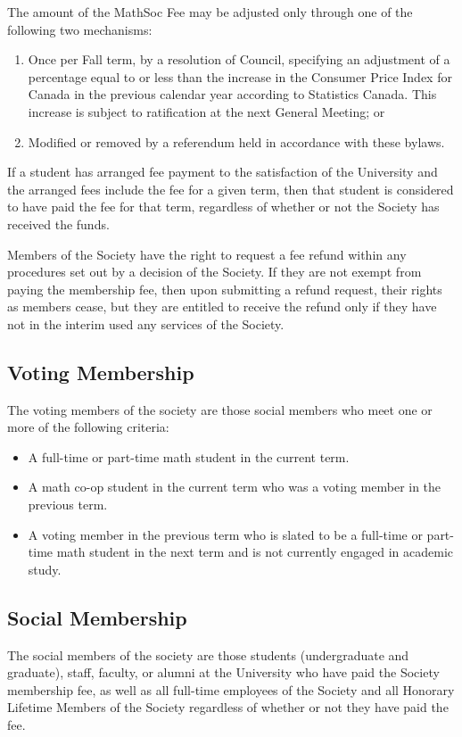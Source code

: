 The amount of the MathSoc Fee may be adjusted only through one of the following two mechanisms:
\begin{enumerate}
\item Once per Fall term, by a resolution of Council, specifying an adjustment of a percentage equal
to or less than the increase in the Consumer Price Index for Canada in the previous calendar year
according to Statistics Canada. This increase is subject to ratification at the next General Meeting; or
\item Modified or removed by a referendum held in accordance with these bylaws.
\end{enumerate}

If a student has arranged fee payment to the satisfaction of the University and
the arranged fees include the fee for a given term, then that student is
considered to have paid the fee for that term, regardless of whether or not the
Society has received the funds.

Members of the Society have the right to request a fee refund within any
procedures set out by a decision of the Society. If they are not exempt from
paying the membership fee, then upon submitting a refund request, their rights
as members cease, but they are entitled to receive the refund only if they have
not in the interim used any services of the Society.

\subsection{Voting Membership}
The voting members of the society are those social members who meet one or more
of the following criteria:
\begin{itemize}
  \item A full-time or part-time math student in the current term.
  \item A math co-op student in the current term who was a voting member in the
    previous term.
  \item A voting member in the previous term who is slated to be a full-time or
    part-time math student in the next term and is not currently engaged in
    academic study.
\end{itemize}

\subsection{Social Membership}
The social members of the society are those students (undergraduate and
graduate), staff, faculty, or alumni at the University who have paid the Society
membership fee, as well as all full-time employees of the Society and all
Honorary Lifetime Members of the Society regardless of whether or not they have
paid the fee.

